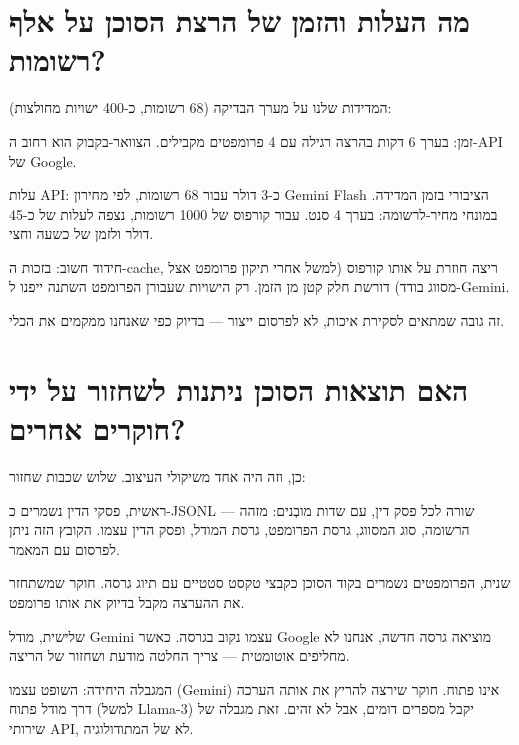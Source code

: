 \documentclass[12pt,a4paper]{article}
\begin{document}
\section{\texthebrew{מה העלות והזמן של הרצת הסוכן על אלף רשומות?}}
\begin{hebrew}
המדידות שלנו על מערך הבדיקה (68 רשומות, כ-400 ישויות מחולצות):
\par
זמן: בערך 6 דקות בהרצה רגילה עם 4 פרומפטים מקבילים. הצוואר-בקבוק הוא רחוב ה-API של Google.
\par
עלות API: כ-3 דולר עבור 68 רשומות, לפי מחירון Gemini Flash הציבורי בזמן המדידה. במונחי מחיר-לרשומה: בערך 4 סנט. עבור קורפוס של 1000 רשומות, נצפה לעלות של כ-45 דולר ולזמן של כשעה וחצי.
\par
חידוד חשוב: בזכות ה-cache, ריצה חוזרת על אותו קורפוס (למשל אחרי תיקון פרומפט אצל מסווג בודד) דורשת חלק קטן מן הזמן. רק הישויות שעבורן הפרומפט השתנה ייפנו ל-Gemini.
\par
זה גובה שמתאים לסקירת איכות, לא לפרסום ייצור --- בדיוק כפי שאנחנו ממקמים את הכלי.
\end{hebrew}


\section{\texthebrew{האם תוצאות הסוכן ניתנות לשחזור על ידי חוקרים אחרים?}}
\begin{hebrew}
כן, וזה היה אחד משיקולי העיצוב. שלוש שכבות שחזור:
\par
ראשית, פסקי הדין נשמרים כ-JSONL --- שורה לכל פסק דין, עם שדות מובְנים: מזהה הרשומה, סוג המסווג, גרסת הפרומפט, גרסת המודל, ופסק הדין עצמו. הקובץ הזה ניתן לפרסום עם המאמר.
\par
שנית, הפרומפטים נשמרים בקוד הסוכן כקבצי טקסט סטטיים עם תיוג גרסה. חוקר שמשתחזר את ההערצה מקבל בדיוק את אותו פרומפט.
\par
שלישית, מודל Gemini עצמו נקוב בגרסה. כאשר Google מוציאה גרסה חדשה, אנחנו לא מחליפים אוטומטית --- צריך החלטה מודעת ושחזור של הריצה.
\par
המגבלה היחידה: השופט עצמו (Gemini) אינו פתוח. חוקר שירצה להריץ את אותה הערכה דרך מודל פתוח (למשל Llama-3) יקבל מספרים דומים, אבל לא זהים. זאת מגבלה של שירותי API, לא של המתודולוגיה.
\end{hebrew}
\end{document}
